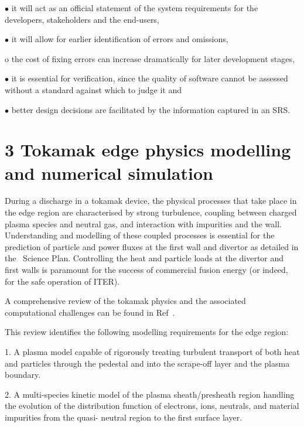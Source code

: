 \documentclass{article}
\begin{document}
\item[$\bullet$] it will act as an official statement of the system requirements for the developers, 
stakeholders and the end-users,

\item[$\bullet$] it will allow for earlier identification of errors and omissions,

o the cost of fixing errors can increase dramatically for later development stages,

\item[$\bullet$] it is essential for verification, since the quality of software cannot be assessed 
without a standard against which to judge it and

\item[$\bullet$] better design decisions are facilitated by the information captured in an SRS.

\section*{{\Large{}{ \textbf{3 Tokamak edge physics modelling and 
numerical simulation}}}}

During a discharge in a tokamak device, the physical processes that take place 
in the edge region are characterised by strong turbulence, coupling between charged 
plasma species and neutral gas, and interaction with impurities and the wall. Understanding 
and modelling of these coupled processes is essential for the prediction of particle 
and power fluxes at the first wall and divertor as detailed in the \exc \   Science 
Plan. Controlling the heat and particle loads at the divertor and first walls is 
paramount for the success of commercial fusion energy (or indeed, for the safe 
operation of ITER).

A comprehensive review of the tokamak physics and the associated computational 
challenges can be found in Ref~\cite{ref [6]}.

This review identifies the following modelling requirements for the edge region:

{ 1. A plasma model capable of rigorously treating turbulent transport 
of both heat and particles through the pedestal and into the scrape-off layer and 
the plasma boundary.}

{ 2. A multi-species kinetic model of the plasma sheath/presheath 
region handling the evolution of the distribution function of electrons, ions, 
neutrals, and material impurities from the quasi- neutral region to the first surface 
layer.}
\end{document}
